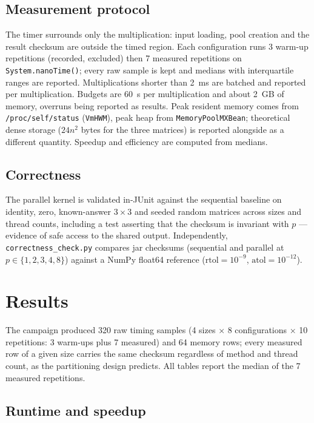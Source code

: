 \documentclass[11pt,a4paper]{article}
\begin{document}
\subsection{Measurement protocol}

The timer surrounds only the multiplication: input loading, pool creation
and the result checksum are outside the timed region. Each configuration
runs 3 warm-up repetitions (recorded, excluded) then 7 measured
repetitions on \texttt{System.nanoTime()}; every raw sample is kept and
medians with interquartile ranges are reported. Multiplications shorter
than 2~ms are batched and reported per multiplication. Budgets are 60~s
per multiplication and about 2~GB of memory, overruns being reported as
results. Peak resident memory comes from \texttt{/proc/self/status}
(\texttt{VmHWM}), peak heap from \texttt{MemoryPoolMXBean}; theoretical
dense storage ($24n^2$ bytes for the three matrices) is reported alongside
as a different quantity. Speedup and efficiency are computed from medians.

\subsection{Correctness}

The parallel kernel is validated in-JUnit against the sequential baseline
on identity, zero, known-answer $3 \times 3$ and seeded random matrices
across sizes and thread counts, including a test asserting that the
checksum is invariant with $p$ --- evidence of safe access to the shared
output. Independently, \texttt{correctness\_check.py} compares jar
checksums (sequential and parallel at $p \in \{1,2,3,4,8\}$) against a
NumPy float64 reference ($\mathrm{rtol} = 10^{-9}$,
$\mathrm{atol} = 10^{-12}$).

\section{Results}
\label{sec:results}

The campaign produced 320 raw timing samples (4 sizes $\times$ 8
configurations $\times$ 10 repetitions: 3 warm-ups plus 7 measured) and 64
memory rows; every measured row of a given size carries the same checksum
regardless of method and thread count, as the partitioning design
predicts. All tables report the median of the 7 measured repetitions.

\subsection{Runtime and speedup}
\end{document}

